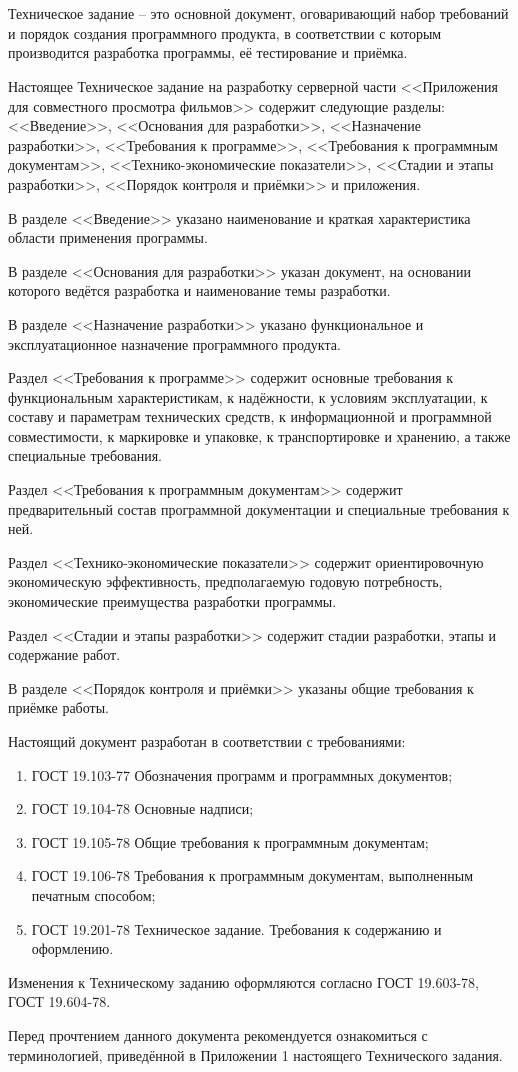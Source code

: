 \section*{}

Техническое задание -- это основной документ, оговаривающий набор требований и порядок создания программного продукта,
в соответствии с которым производится разработка программы, её тестирование и приёмка.

Настоящее Техническое задание на разработку серверной части <<Приложения для совместного просмотра фильмов>> содержит следующие разделы:
<<Введение>>, <<Основания для разработки>>, <<Назначение разработки>>, <<Требования к программе>>, <<Требования к программным документам>>,
<<Технико-экономические показатели>>, <<Стадии и этапы разработки>>, <<Порядок контроля и приёмки>> и приложения.

В разделе <<Введение>> указано наименование и краткая характеристика области применения программы.

В разделе <<Основания для разработки>> указан документ, на основании которого ведётся разработка и наименование темы разработки.

В разделе <<Назначение разработки>> указано функциональное и эксплуатационное назначение программного продукта.

Раздел <<Требования к программе>> содержит основные требования к функциональным характеристикам, к надёжности, к условиям
эксплуатации, к составу и параметрам технических средств, к информационной и программной совместимости, к маркировке и
упаковке, к транспортировке и хранению, а также специальные требования.

Раздел <<Требования к программным документам>> содержит предварительный состав программной документации и специальные требования к ней.

Раздел <<Технико-экономические показатели>> содержит ориентировочную экономическую эффективность,
предполагаемую годовую потребность, экономические преимущества разработки программы.

Раздел <<Стадии и этапы разработки>> содержит стадии разработки, этапы и содержание работ.

В разделе <<Порядок контроля и приёмки>> указаны общие требования к приёмке работы.

Настоящий документ разработан в соответствии с требованиями:
\begin{enumerate}
    \item ГОСТ 19.103-77 Обозначения программ и программных документов;
    \item ГОСТ 19.104-78 Основные надписи;
    \item ГОСТ 19.105-78 Общие требования к программным документам;
    \item ГОСТ 19.106-78 Требования к программным документам, выполненным печатным способом;
    \item ГОСТ 19.201-78 Техническое задание.
    Требования к содержанию и оформлению.
\end{enumerate}

Изменения к Техническому заданию оформляются согласно ГОСТ 19.603-78, ГОСТ 19.604-78.

Перед прочтением данного документа рекомендуется ознакомиться с терминологией, приведённой в Приложении 1 настоящего
Технического задания.